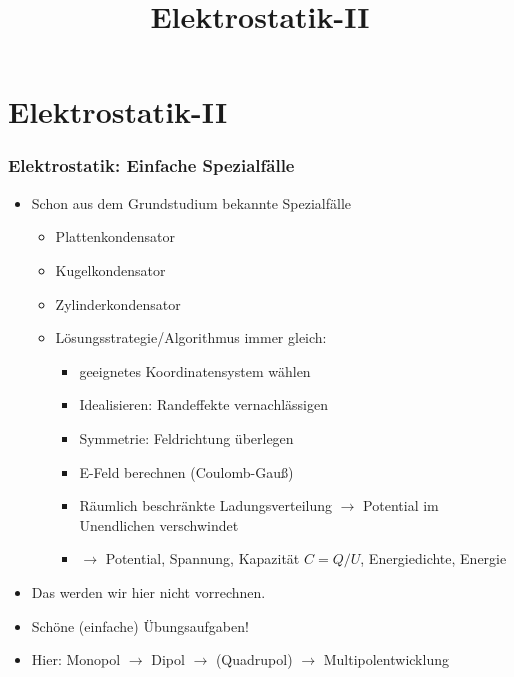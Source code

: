 

\title[TET: Elektrostatik-II]{Elektrostatik-II}


% 
% 

\maketitle

% 
% 
\section{Elektrostatik-II}

\begin{frame}

  \frametitle{Elektrostatik: Einfache Spezialfälle}

  \begin{itemize}[<+->]
  \item Schon aus dem Grundstudium bekannte Spezialfälle
    \begin{itemize}[<+->]
      \item Plattenkondensator
      \item Kugelkondensator
      \item Zylinderkondensator
      \item \alert{Lösungsstrategie/Algorithmus} immer gleich:
        \begin{itemize}[<+->]
        \item geeignetes Koordinatensystem wählen
        \item Idealisieren: Randeffekte vernachlässigen
        \item Symmetrie: Feldrichtung überlegen
        \item E-Feld berechnen (Coulomb-Gauß)
          \item Räumlich beschränkte Ladungsverteilung $\to$ Potential
            im Unendlichen verschwindet
          \item $\to$ Potential, Spannung, Kapazität $C = Q/U$,
            Energiedichte, Energie
          \end{itemize}
        \end{itemize}
      \item Das werden wir hier nicht vorrechnen.
      \item Schöne (einfache) Übungsaufgaben!
        \item Hier: Monopol $\to$ Dipol $\to$ (Quadrupol) $\to$ \alert{Multipolentwicklung}  
  \end{itemize}
  
\end{frame}


